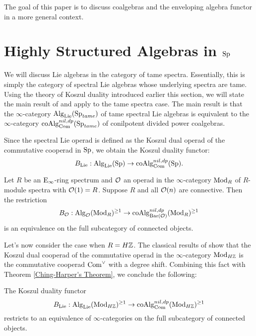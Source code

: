 The goal of this paper is to discuss coalgebras and the enveloping algebra functor in a more general context. 

\section{Highly Structured Algebras in $\operatorname{Sp}$}
We will discuss Lie algebras in the category of tame spectra. Essentially, this is simply the category of spectral Lie algebras whose underlying spectra are tame.
Using the theory of Koszul duality introduced earlier this section, we will state the main result of \cite{Ching-Harper} and apply to the tame spectra case. The main result is that the $\infty$-category $\operatorname{Alg}_{\operatorname{Lie}}(\operatorname{Sp}_{tame})$ of tame spectral Lie algebras is equivalent to the $\infty$-category $\operatorname{coAlg}^{nil, dp}_{\operatorname{Com}}(\operatorname{Sp}_{tame})$ of conilpotent divided power coalgebras.

\begin{definition}
\end{definition}

Since the spectral Lie operad is defined as the Koszul dual operad of the commutative cooperad in $\operatorname{Sp}$, we obtain the Koszul duality functor:
\[
B_{\operatorname{Lie}}: \operatorname{Alg}_{\operatorname{Lie}}(\operatorname{Sp}) \to \operatorname{coAlg}^{nil, dp}_{\operatorname{Com}}(\operatorname{Sp}).
\]

\begin{theorem}
\label{Ching-Harper's Theorem}
\cite{Ching-Harper}
\label{Ching-Harper's Koszul duality}
	Let $R$ be an $\operatorname{E}_{\infty}$-ring spectrum and ${\mathcal{O}}$ an operad in the $\infty$-category $\operatorname{Mod}_R$ of $R$-module spectra with ${\mathcal{O}}(1)=R$. Suppose $R$ and all ${\mathcal{O}}(n)$ are connective. Then the restriction 
	\[
	B_{{\mathcal{O}}}: \operatorname{Alg}_{{\mathcal{O}}}(\operatorname{Mod}_R)^{\geq 1} \to \operatorname{coAlg}^{nil, dp}_{\operatorname{Bar}({\mathcal{O}})}(\operatorname{Mod}_R)^{\geq 1}
	\]
	 is an equivalence on the full subcategory of connected objects.
\end{theorem}

Let's now consider the case when $R=H{\mathbb{Z}}$. The classical results of \cite{Ginzburg-Kapranov} show that the Koszul dual cooperad of the commutative operad in the $\infty$-category $\operatorname{Mod}_{H{\mathbb{Z}}}$ is the commutative cooperad $\operatorname{Com}^{\vee}$ with a degree shift.
Combining this fact with Theorem \ref{Ching-Harper's Theorem}, we conclude the following:
\begin{corollary}
	The Koszul duality functor 
	\[
	B_{\operatorname{Lie}}: \operatorname{Alg}_{\operatorname{Lie}}(\operatorname{Mod}_{H{\mathbb{Z}}})^{\geq 1} \to \operatorname{coAlg}^{nil, dp}_{\operatorname{Com}}(\operatorname{Mod}_{H{\mathbb{Z}}})^{\geq 1}
	\]
	restricts to an equivalence of $\infty$-categories on the full subcategory of connected objects.
\end{corollary}


